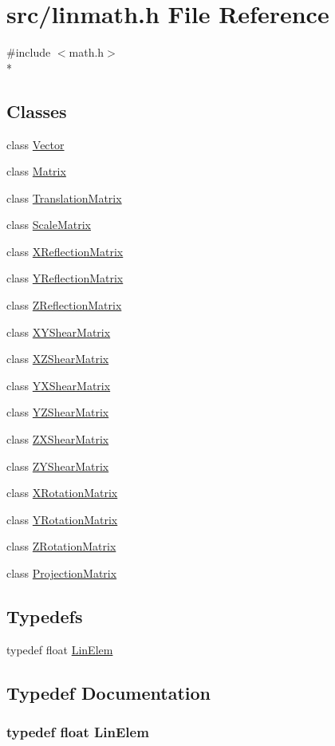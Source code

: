 \hypertarget{a00234}{\section{src/linmath.h File Reference}
\label{a00234}
}
{\ttfamily \#include $<$math.\-h$>$}\\*
\subsection*{Classes}
\begin{DoxyCompactItemize}
\item 
class \hyperlink{a00152}{Vector}
\item 
class \hyperlink{a00111}{Matrix}
\item 
class \hyperlink{a00151}{Translation\-Matrix}
\item 
class \hyperlink{a00123}{Scale\-Matrix}
\item 
class \hyperlink{a00155}{X\-Reflection\-Matrix}
\item 
class \hyperlink{a00159}{Y\-Reflection\-Matrix}
\item 
class \hyperlink{a00164}{Z\-Reflection\-Matrix}
\item 
class \hyperlink{a00157}{X\-Y\-Shear\-Matrix}
\item 
class \hyperlink{a00158}{X\-Z\-Shear\-Matrix}
\item 
class \hyperlink{a00161}{Y\-X\-Shear\-Matrix}
\item 
class \hyperlink{a00163}{Y\-Z\-Shear\-Matrix}
\item 
class \hyperlink{a00166}{Z\-X\-Shear\-Matrix}
\item 
class \hyperlink{a00167}{Z\-Y\-Shear\-Matrix}
\item 
class \hyperlink{a00156}{X\-Rotation\-Matrix}
\item 
class \hyperlink{a00160}{Y\-Rotation\-Matrix}
\item 
class \hyperlink{a00165}{Z\-Rotation\-Matrix}
\item 
class \hyperlink{a00120}{Projection\-Matrix}
\end{DoxyCompactItemize}
\subsection*{Typedefs}
\begin{DoxyCompactItemize}
\item 
typedef float \hyperlink{a00234_a4f6e9fb2a8330a392e7819d1aef8881a}{Lin\-Elem}
\end{DoxyCompactItemize}


\subsection{Typedef Documentation}
\hypertarget{a00234_a4f6e9fb2a8330a392e7819d1aef8881a}{
\subsubsection[{Lin\-Elem}]{\setlength{\rightskip}{0pt plus 5cm}typedef float {\bf Lin\-Elem}}}\label{a00234_a4f6e9fb2a8330a392e7819d1aef8881a}
